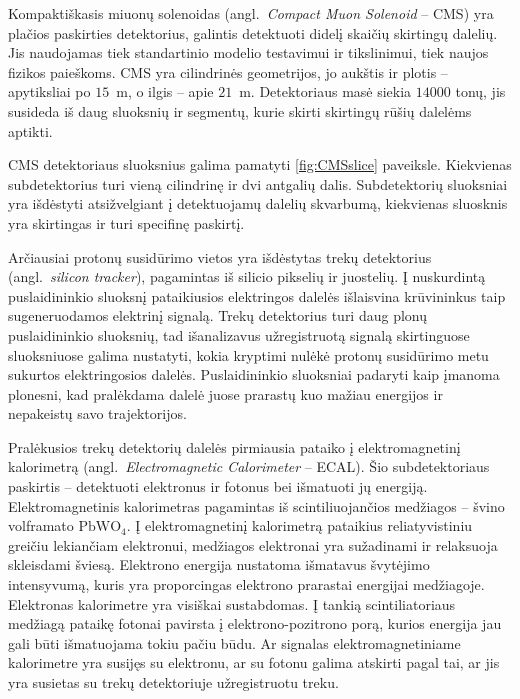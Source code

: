 \documentclass[a4paper, 12pt, oneside]{article}
\begin{document}
Kompaktiškasis miuonų solenoidas (angl.\ \textit{Compact Muon Solenoid} -- CMS) \cite{CMSexperiment}
yra plačios paskirties detektorius, galintis detektuoti didelį skaičių skirtingų dalelių.
Jis naudojamas tiek standartinio modelio testavimui ir tikslinimui, tiek naujos fizikos paieškoms.
CMS yra cilindrinės geometrijos, jo aukštis ir plotis -- apytiksliai po $15$~m, o ilgis --
apie $21$~m.
Detektoriaus masė siekia $14000$ tonų, jis susideda iš daug sluoksnių ir segmentų, kurie skirti
skirtingų rūšių dalelėms aptikti.

CMS detektoriaus sluoksnius galima pamatyti \ref{fig:CMSslice} paveiksle.
Kiekvienas subdetektorius turi vieną cilindrinę ir dvi antgalių dalis.
Subdetektorių sluoksniai yra išdėstyti atsižvelgiant į detektuojamų dalelių skvarbumą, kiekvienas sluosknis
yra skirtingas ir turi specifinę paskirtį.

Arčiausiai protonų susidūrimo vietos yra išdėstytas trekų detektorius (angl.\ \textit{silicon tracker}),
pagamintas iš silicio pikselių ir juostelių.
Į nuskurdintą puslaidininkio sluoksnį pataikiusios elektringos dalelės išlaisvina krūvininkus taip sugeneruodamos
elektrinį signalą.
Trekų detektorius turi daug plonų puslaidininkio sluoksnių, tad išanalizavus užregistruotą signalą skirtinguose
sluoksniuose galima nustatyti, kokia kryptimi nulėkė protonų susidūrimo metu sukurtos elektringosios dalelės.
Puslaidininkio sluoksniai padaryti kaip įmanoma plonesni, kad pralėkdama dalelė juose prarastų kuo mažiau energijos
ir nepakeistų savo trajektorijos.

Pralėkusios trekų detektorių dalelės pirmiausia pataiko į elektromagnetinį kalorimetrą (angl.\ \textit{Electromagnetic Calorimeter} -- ECAL).
Šio subdetektoriaus paskirtis -- detektuoti elektronus ir fotonus bei išmatuoti jų energiją.
Elektromagnetinis kalorimetras pagamintas iš scintiliuojančios medžiagos -- švino volframato $\mathrm{PbWO}_{4}$.
Į elektromagnetinį kalorimetrą pataikius reliatyvistiniu greičiu lekiančiam elektronui, medžiagos elektronai yra sužadinami
ir relaksuoja skleisdami šviesą.
Elektrono energija nustatoma išmatavus švytėjimo intensyvumą, kuris yra proporcingas elektrono prarastai energijai medžiagoje.
Elektronas kalorimetre yra visiškai sustabdomas.
Į tankią scintiliatoriaus medžiagą pataikę fotonai pavirsta į elektrono-pozitrono porą, kurios energija jau gali būti išmatuojama
tokiu pačiu būdu.
Ar signalas elektromagnetiniame kalorimetre yra susijęs su elektronu, ar su fotonu galima atskirti pagal tai, ar jis yra susietas su
trekų detektoriuje užregistruotu treku.
\end{document}
